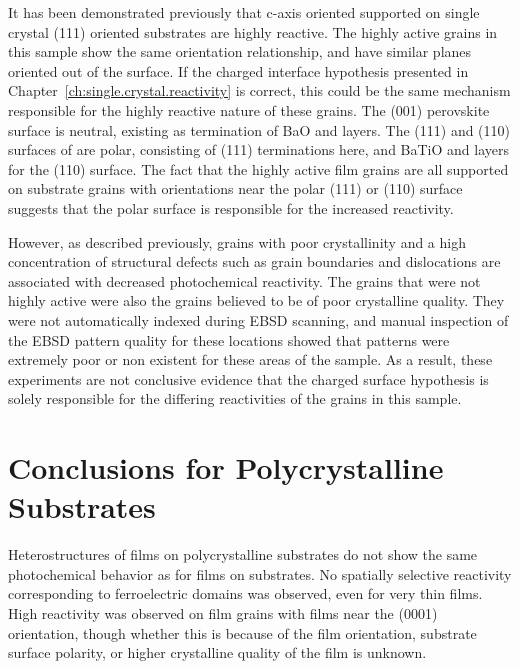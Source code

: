 It has been demonstrated previously that c-axis oriented  supported on single crystal (111) oriented  substrates are highly reactive. The highly active grains in this sample show the same orientation relationship, and have similar planes oriented out of the surface. If the charged interface hypothesis presented in Chapter~\ref{ch:single.crystal.reactivity} is correct, this could be the same mechanism responsible for the highly reactive nature of these grains. The (001) perovskite surface is neutral, existing as termination of BaO and  layers. The (111) and (110) surfaces of  are polar, consisting of (111) terminations here, and BaTiO and  layers for the (110) surface. The fact that the highly active film grains are all supported on substrate grains with orientations near the polar (111) or (110) surface suggests that the polar surface is responsible for the increased reactivity.

However, as described previously, grains with poor crystallinity and a high concentration of structural defects such as grain boundaries and dislocations are associated with decreased photochemical reactivity. The grains that were not highly active were also the grains believed to be of poor crystalline quality. They were not automatically indexed during EBSD scanning, and manual inspection of the EBSD pattern quality for these locations showed that patterns were extremely poor or non existent for these areas of the sample. As a result, these experiments are not conclusive evidence that the charged surface hypothesis is solely responsible for the differing reactivities of the grains in this sample. 


\section{Conclusions for Polycrystalline Substrates}
\label{sec:ch6conclusions}



Heterostructures of  films on polycrystalline  substrates do not show the same photochemical behavior as for  films on  substrates. No spatially selective reactivity corresponding to ferroelectric domains was observed, even for very thin films. High reactivity was observed on film grains with films near the (0001) orientation, though whether this is because of the film orientation, substrate surface polarity, or higher crystalline quality of the film is unknown.
